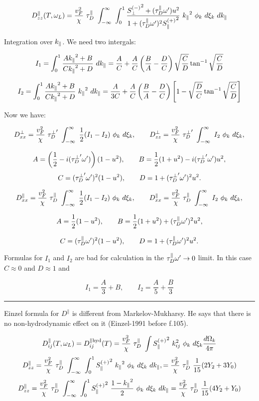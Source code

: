 \documentclass[a4paper]{article}
\begin{document}
$$
D^\parallel_{zz}(T, \omega_L) =
  \frac{v_F^2}{\chi}\ \tau_D^\parallel
  \ \int_{-\infty}^{\infty}\ \int_{0}^{1}
  \frac{{S_\perp^{(-)}}^2 + (\tau_D^\parallel\omega^\prime)u^2 }{1+(\tau_D^\parallel\omega^\prime)^2{S_\parallel^{(+)}}^2}
  \  {k_\parallel}^2\ \phi_k\ d\xi_k\ d{k_\parallel}
$$

\eject
Integration over ${k_\parallel}$. We need two intergals:

$$
I_1 = \int_0^1 \frac{A{k_\parallel}^2 + B}{C {k_\parallel}^2 + D}\ d{k_\parallel} = 
\frac{A}{C} + \frac{A}{C}\left(\frac{B}{A} - \frac{D}{C}\right)
\sqrt{\frac{C}{D}}\tan^{-1}\sqrt{\frac{C}{D}}
$$

$$
I_2 = \int_0^1 \frac{A{k_\parallel}^2 + B}{C {k_\parallel}^2 + D}\ {k_\parallel}^2\ d{k_\parallel} =
\frac{A}{3C} + \frac{A}{C}\left(\frac{B}{A} - \frac{D}{C}\right)
\left[ 1 - \sqrt{\frac{D}{C}}\tan^{-1}\sqrt{\frac{C}{D}} \right]
$$

Now we have:

$$
D^\perp_{xx} =
  \frac{v_F^2}{\chi}\ {\tau_D^\perp}^\prime
  \ \int_{-\infty}^{\infty}
  \ \frac12 (I_1-I_2)\ \phi_k\ d\xi_k,
\qquad
D^\perp_{zz} =
  \frac{v_F^2}{\chi}\ {\tau_D^\perp}^\prime
  \ \int_{-\infty}^{\infty}
  \ I_2\ \phi_k\ d\xi_k,
$$

$$
A = \left(\frac12 - i({\tau_D^\perp}^\prime\omega^\prime)\right) (1-u^2), \qquad
B = \frac12 (1+u^2) - i({\tau_D^\perp}^\prime\omega^\prime) u^2,
$$
$$
C = ({\tau_D^\perp}^\prime\omega^\prime)^2 (1-u^2),\qquad
D = 1 + ({\tau_D^\perp}^\prime\omega^\prime)^2 u^2.
$$

$$
D^\parallel_{xx} =
  \frac{v_F^2}{\chi}\ \tau_D^\parallel
  \ \int_{-\infty}^{\infty}
  \ \frac12 (I_1-I_2)\ \phi_k\ d\xi_k,
\qquad
D^\parallel_{xx} =
  \frac{v_F^2}{\chi}\ \tau_D^\parallel
  \ \int_{-\infty}^{\infty}
  \ I_2\ \phi_k\ d\xi_k,
$$

$$
A = \frac12 (1-u^2), \qquad
B = \frac12 (1+u^2) + (\tau_D^\parallel\omega^\prime)^2 u^2,
$$

$$
C = (\tau_D^\parallel\omega^\prime)^2 (1-u^2),\qquad
D = 1 + (\tau_D^\parallel\omega^\prime)^2 u^2.
$$

Formulas for $I_1$ and $I_2$ are bad for calculation in the $\tau_D^\parallel\omega^\prime \to
0$ limit. In this case $C \approx 0$ and $D \approx 1$ and

$$
I_1 = \frac{A}{3}+B,\qquad
I_2 = \frac{A}{5}+\frac{B}{3}
$$

\hrule\medskip

Einzel formula for $D^\parallel$ is different from Markelov-Mukharsy. He
says that there is no non-hydrodynamic effect on it (Einzel-1991 before
f.105).

$$
D^\parallel_{ij}(T, \omega_L) = D^{\parallel {\rm hyd}}_{ij}(T) =
  \frac{v_F^2}{\chi}\ \tau_D^\parallel
  \  \int {S_\parallel^{(+)}}^2 \ k_{ij}^2\ \phi_k\ d\xi_k\frac{d\Omega_k}{4\pi}
$$
$$
 D^\parallel_{zz}= \frac{v_F^2}{\chi}\ \tau_D^\parallel
  \ \int_{-\infty}^{\infty}\ \int_{0}^{1}
  {S_\parallel^{(+)}}^2\ {k_\parallel}^2\ \phi_k\ d\xi_k\ d{k_\parallel},
 = \frac{v_F^2}{\chi}\ \tau_D^\parallel\ \frac{1}{15}(2Y_2+3Y_0)
$$
$$
 D^\parallel_{zz}= \frac{v_F^2}{\chi}\ \tau_D^\parallel
  \ \int_{-\infty}^{\infty}\ \int_{0}^{1}
  {S_\parallel^{(+)}}^2\ \frac{1-{k_\parallel}^2}{2}\ \phi_k\ d\xi_k\ d{k_\parallel}
 = \frac{v_F^2}{\chi}\ \tau_D^\parallel\ \frac{1}{15}(4Y_2+Y_0)
$$
\end{document}
